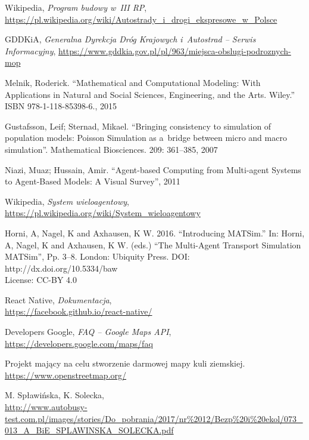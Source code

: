 
\begin{thebibliography}{99}

 Wikipedia, \textit{Program budowy w~III RP},\\ \url{https://pl.wikipedia.org/wiki/Autostrady\_i\_drogi\_ekspresowe\_w\_Polsce}

 GDDKiA, \textit{Generalna Dyrekcja Dróg Krajowych i~Autostrad -- Serwis Informacyjny}, \url{https://www.gddkia.gov.pl/pl/963/miejsca-obslugi-podroznych-mop}

Melnik, Roderick. ``Mathematical and Computational Modeling: With Applications in Natural and Social Sciences, Engineering, and the Arts. Wiley.'' ISBN 978-1-118-85398-6., 2015

Gustafsson, Leif; Sternad, Mikael. ``Bringing consistency to simulation of population models: Poisson Simulation as a~bridge between micro and macro simulation''. Mathematical Biosciences. 209: 361–385, 2007

 Niazi, Muaz; Hussain, Amir. ``Agent-based Computing from Multi-agent Systems to Agent-Based Models: A Visual Survey'', 2011

 Wikipedia, \textit{System wieloagentowy},\\ \url{https://pl.wikipedia.org/wiki/System_wieloagentowy}

 Horni, A, Nagel, K and Axhausen, K W. 2016. ``Introducing MATSim.'' In: Horni, A, Nagel, K and
Axhausen, K W. (eds.) ``The Multi-Agent Transport Simulation MATSim'', Pp. 3–8. London: Ubiquity Press. DOI: http://dx.doi.org/10.5334/baw \\ License: CC-BY 4.0

 React Native, \textit{Dokumentacja}, \\ \url{https://facebook.github.io/react-native/}

 Developers Google, \textit{FAQ -- Google Maps API},\\ \url{https://developers.google.com/maps/faq}

  Projekt mający na celu stworzenie darmowej mapy kuli
  ziemskiej. \url{https://www.openstreetmap.org/} 

 M. Spławińska, K. Solecka, \\
\url{http://www.autobusy-test.com.pl/images/stories/Do_pobrania/2017/nr%2012/Bezp%20i%20ekol/073_013_A_BiE_SPLAWINSKA_SOLECKA.pdf} 


\end{thebibliography}
